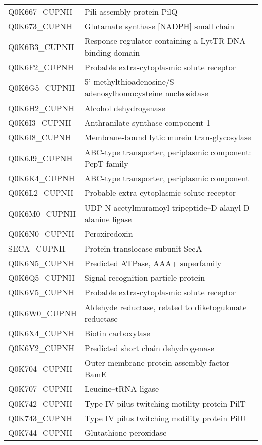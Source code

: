 \begin{center}
\begin{longtable}{ l l }
Q0K667\_CUPNH & Pili assembly protein PilQ \\ [0.5ex]
Q0K673\_CUPNH & Glutamate synthase [NADPH] small chain \\ [0.5ex]
Q0K6B3\_CUPNH & Response regulator containing a LytTR DNA-binding domain \\ [0.5ex]
Q0K6F2\_CUPNH & Probable extra-cytoplasmic solute receptor \\ [0.5ex]
Q0K6G5\_CUPNH & 5'-methylthioadenosine/S-adenosylhomocysteine nucleosidase \\ [0.5ex]
Q0K6H2\_CUPNH & Alcohol dehydrogenase \\ [0.5ex]
Q0K6I3\_CUPNH & Anthranilate synthase component 1 \\ [0.5ex]
Q0K6I8\_CUPNH & Membrane-bound lytic murein transglycosylase \\ [0.5ex]
Q0K6J9\_CUPNH & ABC-type transporter, periplasmic component: PepT family \\ [0.5ex]
Q0K6K4\_CUPNH & ABC-type transporter, periplasmic component \\ [0.5ex]
Q0K6L2\_CUPNH & Probable extra-cytoplasmic solute receptor \\ [0.5ex]
Q0K6M0\_CUPNH & UDP-N-acetylmuramoyl-tripeptide--D-alanyl-D-alanine ligase \\ [0.5ex]
Q0K6N0\_CUPNH & Peroxiredoxin \\ [0.5ex]
SECA\_CUPNH & Protein translocase subunit SecA \\ [0.5ex]
Q0K6N5\_CUPNH & Predicted ATPase, AAA+ superfamily \\ [0.5ex]
Q0K6Q5\_CUPNH & Signal recognition particle protein \\ [0.5ex]
Q0K6V5\_CUPNH & Probable extra-cytoplasmic solute receptor \\ [0.5ex]
Q0K6W0\_CUPNH & Aldehyde reductase, related to diketogulonate reductase \\ [0.5ex]
Q0K6X4\_CUPNH & Biotin carboxylase \\ [0.5ex]
Q0K6Y2\_CUPNH & Predicted short chain dehydrogenase \\ [0.5ex]
Q0K704\_CUPNH & Outer membrane protein assembly factor BamE \\ [0.5ex]
Q0K707\_CUPNH & Leucine--tRNA ligase \\ [0.5ex]
Q0K742\_CUPNH & Type IV pilus twitching motility protein PilT \\ [0.5ex]
Q0K743\_CUPNH & Type IV pilus twitching motility protein PilU \\ [0.5ex]
Q0K744\_CUPNH & Glutathione peroxidase \\ [0.5ex]

\end{longtable}
\end{center}
